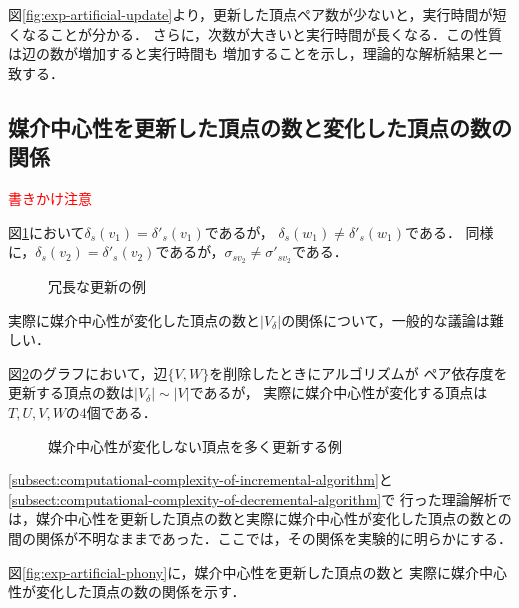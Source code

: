 図\ref{fig:exp-artificial-update}より，更新した頂点ペア数が少ないと，実行時間が短くなることが分かる．
さらに，次数が大きいと実行時間が長くなる．この性質は辺の数が増加すると実行時間も
増加することを示し，理論的な解析結果と一致する．

\subsection{媒介中心性を更新した頂点の数と変化した頂点の数の関係}
\textcolor{red}{書きかけ注意}
\begin{example}
  \label{ex:counter-of-invariability-of-pairwise-dependency}
  図\ref{fig:pd-invariability-counterexample}において$\delta_s(v_1)=\delta'_s(v_1)$であるが，
  $\delta_s(w_1)\neq\delta'_s(w_1)$である．
  同様に，$\delta_s(v_2)=\delta'_s(v_2)$であるが，$\sigma_{sv_2}\neq\sigma'_{sv_2}$である．

  \begin{figure}[tb]
    \centering
    \def\svgwidth{.45\linewidth}
    
    \caption{冗長な更新の例}
    \label{fig:pd-invariability-counterexample}
  \end{figure}
\end{example}

実際に媒介中心性が変化した頂点の数と$\lvert V_\delta\rvert$の関係について，一般的な議論は難しい．

\begin{example}
  図\ref{fig:bc-many-phony}のグラフにおいて，辺$\{V,W\}$を削除したときにアルゴリズムが
  ペア依存度を更新する頂点の数は$\lvert V_\delta\rvert\sim \lvert V\rvert$であるが，
  実際に媒介中心性が変化する頂点は$T,U,V,W$の$4$個である．

  \begin{figure}[tb]
    \centering
    \def\svgwidth{.8\linewidth}
    
    \caption{媒介中心性が変化しない頂点を多く更新する例}
    \label{fig:bc-many-phony}
  \end{figure}
\end{example}

\ref{subsect:computational-complexity-of-incremental-algorithm}と
\ref{subsect:computational-complexity-of-decremental-algorithm}で
行った理論解析では，媒介中心性を更新した頂点の数と実際に媒介中心性が変化した頂点の数との
間の関係が不明なままであった．ここでは，その関係を実験的に明らかにする．

図\ref{fig:exp-artificial-phony}に，媒介中心性を更新した頂点の数と
実際に媒介中心性が変化した頂点の数の関係を示す．


